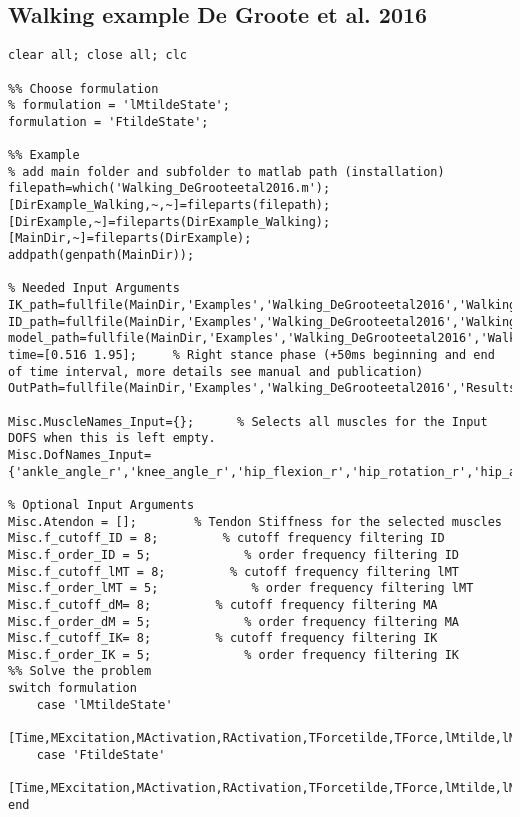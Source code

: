 \documentclass[a4paper,oneside,11pt]{article}
\begin{document}
\subsection{Walking example De Groote et al. 2016}
\begin{lstlisting}[frame=none,basicstyle=\tiny]
clear all; close all; clc

%% Choose formulation
% formulation = 'lMtildeState';
formulation = 'FtildeState';

%% Example
% add main folder and subfolder to matlab path (installation)
filepath=which('Walking_DeGrooteetal2016.m');
[DirExample_Walking,~,~]=fileparts(filepath); [DirExample,~]=fileparts(DirExample_Walking);[MainDir,~]=fileparts(DirExample);
addpath(genpath(MainDir));

% Needed Input Arguments
IK_path=fullfile(MainDir,'Examples','Walking_DeGrooteetal2016','WalkingData','inverse_kinematics.mot');
ID_path=fullfile(MainDir,'Examples','Walking_DeGrooteetal2016','WalkingData','inverse_dynamics.sto');
model_path=fullfile(MainDir,'Examples','Walking_DeGrooteetal2016','WalkingData','subject01.osim');
time=[0.516 1.95];     % Right stance phase (+50ms beginning and end of time interval, more details see manual and publication)
OutPath=fullfile(MainDir,'Examples','Walking_DeGrooteetal2016','Results');

Misc.MuscleNames_Input={};      % Selects all muscles for the Input DOFS when this is left empty.
Misc.DofNames_Input={'ankle_angle_r','knee_angle_r','hip_flexion_r','hip_rotation_r','hip_adduction_r'};

% Optional Input Arguments
Misc.Atendon = [];        % Tendon Stiffness for the selected muscles
Misc.f_cutoff_ID = 8;         % cutoff frequency filtering ID
Misc.f_order_ID = 5;             % order frequency filtering ID
Misc.f_cutoff_lMT = 8;         % cutoff frequency filtering lMT
Misc.f_order_lMT = 5;             % order frequency filtering lMT
Misc.f_cutoff_dM= 8;         % cutoff frequency filtering MA
Misc.f_order_dM = 5;             % order frequency filtering MA
Misc.f_cutoff_IK= 8;         % cutoff frequency filtering IK
Misc.f_order_IK = 5;             % order frequency filtering IK
%% Solve the problem
switch formulation
    case 'lMtildeState'
        [Time,MExcitation,MActivation,RActivation,TForcetilde,TForce,lMtilde,lM,MuscleNames,OptInfo,DatStore]=SolveMuscleRedundancy_lMtildeState(model_path,IK_path,ID_path,time,OutPath,Misc);
    case 'FtildeState'   
        [Time,MExcitation,MActivation,RActivation,TForcetilde,TForce,lMtilde,lM,MuscleNames,OptInfo,DatStore]=SolveMuscleRedundancy_FtildeState(model_path,IK_path,ID_path,time,OutPath,Misc);
end

\end{lstlisting}
\end{document}
